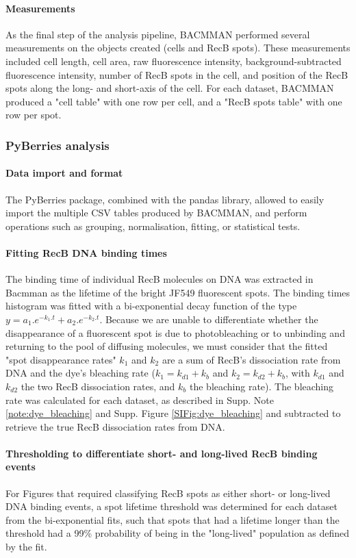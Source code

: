 \paragraph*{Measurements}
As the final step of the analysis pipeline, BACMMAN performed several measurements on the objects created (cells and RecB spots). These measurements included cell length, cell area, raw fluorescence intensity, background-subtracted fluorescence intensity, number of RecB spots in the cell, and position of the RecB spots along the long- and short-axis of the cell. For each dataset, BACMMAN produced a "cell table" with one row per cell, and a "RecB spots table" with one row per spot.

\subsubsection*{PyBerries analysis}
\paragraph*{Data import and format}
The PyBerries package, combined with the pandas library, allowed to easily import the multiple CSV tables produced by BACMMAN, and perform operations such as grouping, normalisation, fitting, or statistical tests.

\paragraph*{Fitting RecB DNA binding times}
The binding time of individual RecB molecules on DNA was extracted in Bacmman as the lifetime of the bright JF549 fluorescent spots. The binding times histogram was fitted with a bi-exponential decay function of the type $y=a_1.e^{-k_1.t} + a_2.e^{-k_2.t}$. Because we are unable to differentiate whether the disappearance of a fluorescent spot is due to photobleaching or to unbinding and returning to the pool of diffusing molecules, we must consider that the fitted "spot disappearance rates" $k_1$ and $k_2$ are a sum of RecB's dissociation rate from DNA and the dye's bleaching rate ($k_1=k_{d1}+k_b$ and $k_2=k_{d2}+k_b$, with $k_{d1}$ and $k_{d2}$ the two RecB dissociation rates, and $k_b$ the bleaching rate). The bleaching rate was calculated for each dataset, as described in Supp. Note \ref{note:dye_bleaching} and Supp. Figure \ref{SIFig:dye_bleaching} and subtracted to retrieve the true RecB dissociation rates from DNA.

\paragraph*{Thresholding to differentiate short- and long-lived RecB binding events}
For Figures that required classifying RecB spots as either short- or long-lived DNA binding events, a spot lifetime threshold was determined for each dataset from the bi-exponential fits, such that spots that had a lifetime longer than the threshold had a 99\% probability of being in the "long-lived" population as defined by the fit.

